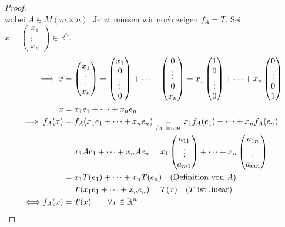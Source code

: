 \begin{proof}
\[    \]
    wobei $A\in M(m\times n)$. Jetzt müssen wir \underline{noch zeigen} $f_A = T$. Sei $x = \begin{pmatrix}
        x_1\\\vdots\\ x_n
    \end{pmatrix}\in\mathbb{R}^n$.
    \begin{align*}
        \implies x &= \begin{pmatrix}
            x_1\\\vdots\\ x_n
        \end{pmatrix} = \begin{pmatrix}
            x_1\\0\\\vdots\\0
        \end{pmatrix} + \dots + \begin{pmatrix}
            0\\\vdots\\0 \\x_n
        \end{pmatrix} = x_1 \begin{pmatrix}
            1\\0\\\vdots\\0
        \end{pmatrix} + \dots + x_n \begin{pmatrix}
            0\\\vdots\\0\\1
        \end{pmatrix}\\
        x &= x_1e_1 + \dots + x_ne_n\\
        \implies f_A(x) &= f_A(x_1e_1 + \dots + x_ne_n) \underset{f_A \text{ linear}}{=} x_1f_A(e_1) + \dots + x_nf_A(e_n)\\
        &= x_1Ae_1 + \dots + x_nAe_n = x_1 \begin{pmatrix}
            a_{11}\\\vdots\\a_{m1}
        \end{pmatrix} + \dots + x_n \begin{pmatrix}
            a_{1n}\\\vdots\\a_{mn}
        \end{pmatrix}\\
        &= x_1T(e_1) + \dots + x_nT(e_n)\quad(\text{Definition von } A)\\
        &= T(x_1e_1 + \dots + x_ne_n) = T(x)\quad (T \text{ ist linear})\\
        \Longleftrightarrow f_A(x) &= T(x)\qquad\forall x \in \mathbb{R}^n
    \end{align*}
\end{proof}
